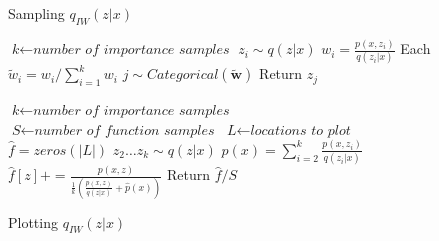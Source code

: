 \documentclass{article} %
\begin{document}
\begin{figure}[t]
  \centering
      \subfloat%
        {
            \begin{minipage}[t]{0.45\columnwidth}
            \begin{algorithm}[H]
            \caption{Sampling $q_{IW}(z|x)$}\label{sampling_qiw}
            \begin{algorithmic}[1]
                \State $\textit{k} \gets \textit{number of importance samples}$
                    \State $z_i \sim q(z|x)$
                    \State $w_i = \frac{p(x,z_i)}{q(z_i|x)}$
                \EndFor
                \State Each $\tilde w_i = w_i/\sum_{i=1}^{k} w_i$
                \State $j \sim Categorical(\bm{\tilde{w}})$
                \State Return $z_j$
            \end{algorithmic}
            \end{algorithm}
            \end{minipage}
        }
        \hspace{-.5cm}
        \qquad \qquad %
      \subfloat%
        {
            \begin{minipage}[t]{0.45\columnwidth}
            \begin{algorithm}[H]
            \caption{Plotting $q_{IW}(z|x)$} \label{plotting_qeiw}        
            \begin{algorithmic}[1]
                \State $\textit{k} \gets \textit{number of importance samples}$
                \State $\textit{S} \gets \textit{number of function samples}$
                \State $\textit{L} \gets \textit{locations to plot}$
                \State $\hat f = zeros(|L|)$
                    \State $z_2\dots z_k \sim q(z|x)$
                    \State $\hat{p}(x)=\sum_{i=2}^{k} \frac{p(x,z_i)}{q(z_i|x)}$
                        \State $\hat f[z] \mathrel{{+}{=}} \frac{p(x,z)}{\frac{1}{k} \left(  \frac{p(x,z)}{q(z|x)}+ \hat{p}(x) \right)}$
                    \EndFor
                \EndFor
                \State Return ${\hat f} / S$
            \end{algorithmic}
            \end{algorithm}
            \end{minipage}
        }
\end{figure}
\end{document}
